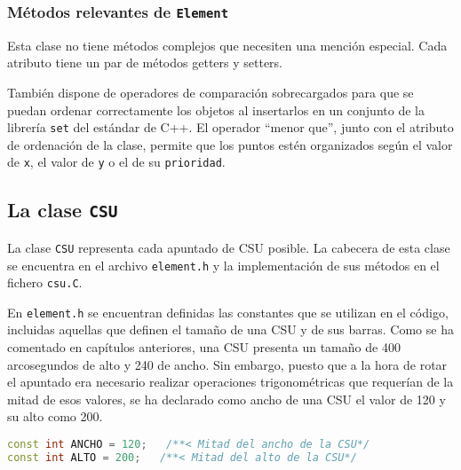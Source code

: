 \subsubsection{Métodos relevantes de \texttt{Element}}
Esta clase no tiene métodos complejos que necesiten una mención especial. Cada
atributo tiene un par de métodos getters y setters.

También dispone de operadores de comparación sobrecargados para que se puedan
ordenar correctamente los objetos al insertarlos en un conjunto de la librería
\texttt{set} del estándar de C++. El operador ``menor que'', junto con el atributo
de ordenación de la clase, permite que los puntos estén organizados según el
valor de \texttt{x}, el valor de \texttt{y} o el de su \texttt{prioridad}.

\subsection{La clase \texttt{CSU}}
La clase \texttt{CSU} representa cada apuntado de CSU posible. La cabecera de
esta clase se encuentra en el archivo \texttt{element.h} y la implementación de
sus métodos en el fichero \texttt{csu.C}. 

En \texttt{element.h} se encuentran definidas las constantes que se utilizan
en el código, incluidas aquellas que definen el tamaño de una CSU y de sus
barras. Como se ha comentado en capítulos anteriores, una CSU presenta un tamaño
de 400 arcosegundos de alto y 240 de ancho. Sin embargo, puesto que a la hora de
rotar el apuntado era necesario realizar operaciones trigonométricas que
requerían de la mitad de esos valores, se ha declarado como ancho de una CSU el
valor de 120 y su alto como 200.

\begin{lstlisting}[language=C++,
                   caption={Constantes de tamaño de la CSU},label={codigo:ctes0}]
const int ANCHO = 120;   /**< Mitad del ancho de la CSU*/
const int ALTO = 200;   /**< Mitad del alto de la CSU*/
\end{lstlisting}

